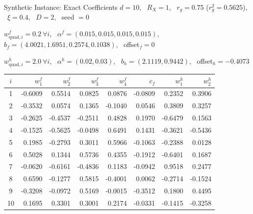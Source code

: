 \documentclass{beamer}
\begin{document}
\begin{frame}{Synthetic Instance: Exact Coefficients}
  \small
  $d=10$, \ $R_X=1$, \ $r_g=0.75$ ($r_g^2=0.5625$), \ $\xi=0.4$, \ $D=2$, \ seed $=0$

  \vspace{0.3em}
  $w^f_{\mathrm{quad},i}=0.2\ \forall i$, \ $\alpha^f=(0.015,0.015,0.015,0.015)$, \ $b_f=(4.0021,1.6951,0.2574,0.1038)$, \ offset$_f=0$

  \vspace{0.3em}
  $w^h_{\mathrm{quad},i}=2.0\ \forall i$, \ $\alpha^h=(0.02,0.03)$, \ $b_h=(2.1119,0.9442)$, \ offset$_h=-0.4073$

  \vspace{0.5em}
  \centering
  \tiny
  \begin{tabular}{c|rrrr|r|rr}
    $i$ & $w^f_1$ & $w^f_2$ & $w^f_3$ & $w^f_4$ & $c_f$ & $w^h_1$ & $w^h_2$ \\
    \hline
    1  & -0.6009 &  0.5514 &  0.0825 &  0.0876 & -0.0809 &  0.2352 &  0.3906 \\
    2  & -0.3532 &  0.0574 &  0.1365 & -0.1040 &  0.0546 &  0.3809 &  0.3257 \\
    3  & -0.2625 & -0.4537 & -0.2511 &  0.4828 &  0.1970 & -0.6479 &  0.1563 \\
    4  & -0.1525 & -0.5625 & -0.0498 &  0.6491 &  0.1431 & -0.3621 & -0.5436 \\
    5  &  0.1985 & -0.2793 &  0.3011 &  0.5966 & -0.1063 & -0.2388 &  0.0128 \\
    6  &  0.5028 &  0.1344 &  0.5736 &  0.4355 & -0.1912 & -0.6401 &  0.1687 \\
    7  & -0.0620 & -0.6161 & -0.4836 &  0.1183 & -0.0942 &  0.9518 &  0.2477 \\
    8  &  0.6590 & -0.1277 &  0.5815 & -0.4001 &  0.0062 & -0.2714 & -0.1524 \\
    9  & -0.3208 & -0.0972 &  0.5169 & -0.0015 & -0.3512 &  0.1800 &  0.4495 \\
    10 &  0.1695 &  0.3301 &  0.3001 &  0.2174 & -0.0331 & -0.1415 & -0.3258 \\
  \end{tabular}
\end{frame}
\end{document}
